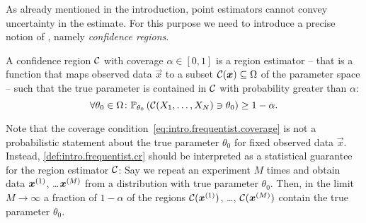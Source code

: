 



As already mentioned in the introduction, point estimators cannot convey uncertainty in the estimate.
For this purpose we need to introduce a precise notion of , namely \emph{confidence regions}.
\begin{definition}\label{def:intro.frequentist.cr}
  A confidence region $\mathcal{C}$ with coverage $\alpha \in [0,1]$ is a region estimator -- that is a function that maps observed data $\vec x$ to a subset $\mathcal{C}({\boldsymbol{x}}) \subseteq \Omega$ of the parameter space -- such that the true parameter is contained in $\mathcal{C}$ with probability greater than $\alpha$:
  \[
    \label{eq:intro.frequentist.coverage}
    \forall \theta_0\in\Omega \colon \mathbb{P}_{\theta_0}\left( \mathcal{C}(X_1, \ldots, X_N) \ni \theta_0 \right) \ge 1 - \alpha.
  \]
\end{definition}
Note that the coverage condition~\eqref{eq:intro.frequentist.coverage} is not a probabilistic statement about the true parameter $\theta_0$ for fixed observed data $\vec x$.
Instead, \cref{def:intro.frequentist.cr} should be interpreted as a statistical guarantee for the region estimator $\mathcal{C}$:
Say we repeat an experiment $M$ times and obtain data ${\boldsymbol{x}}^{(1)}$, \ldots ${\boldsymbol{x}}^{(M)}$ from a distribution with true parameter $\theta_0$.
Then, in the limit $M \to \infty$ a fraction of $1 - \alpha$ of the regions $\mathcal{C}({\boldsymbol{x}}^{(1)})$, \ldots, $\mathcal{C}({\boldsymbol{x}}^{(M)})$ contain the true parameter $\theta_0$.

